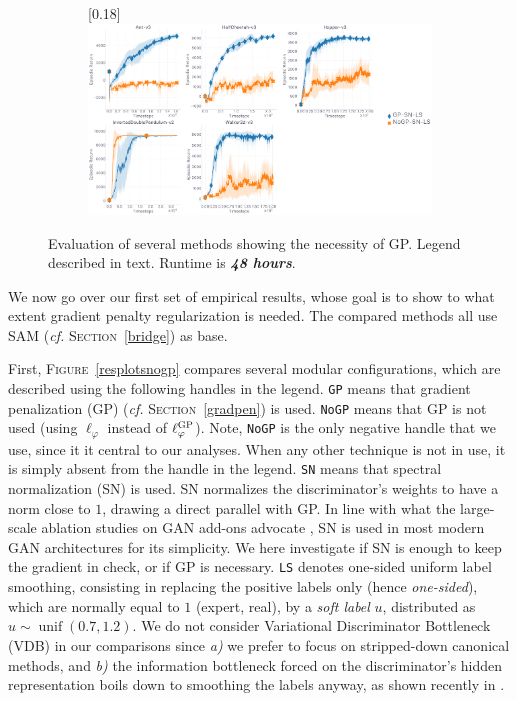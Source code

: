 \begin{figure}
  \center
  \begin{subfigure}[t]{0.99\textwidth}
    \center\scalebox{0.18}[0.18]{\includegraphics{Plots/fig03_gp_48h_5envs/plots_eval_env_ret_plot.pdf}}
  \end{subfigure}
  \caption{
  Evaluation of several methods showing the necessity of GP.
  Legend described in text.
  Runtime is \textbf{\emph{48 hours}}.}
  \label{resplotsgp2}
\end{figure}

We now go over our first set of empirical results, whose goal is to show
to what extent gradient penalty regularization is needed.
The compared methods all use SAM (\textit{cf.} \textsc{Section}~\ref{bridge})
as base.

First, \textsc{Figure}~\ref{resplotsnogp} compares several modular configurations,
which are described using the following handles in the legend.
\texttt{GP} means that gradient penalization (GP)
(\textit{cf.} \textsc{Section}~\ref{gradpen}) is used.
\texttt{NoGP} means that GP is not used
(using $\ell_\varphi$ instead of $\ell_\varphi^\textsc{GP}$).
Note, \texttt{NoGP} is the only negative handle that we use, since it it central to our analyses.
When any other technique is not in use, it is simply absent from the handle in the legend.
\texttt{SN} means that spectral normalization (SN) \cite{Miyato2018-wc} is used.
SN normalizes the discriminator's weights to have a norm close to $1$,
drawing a direct parallel with GP.
In line with what the large-scale ablation studies on GAN add-ons advocate
\cite{Lucic2017-nz,Kurach2018-cs}, SN is used in most modern GAN architectures for its simplicity.
We here investigate if SN is enough to keep the gradient in check, or if GP is necessary.
\texttt{LS} denotes one-sided uniform label smoothing, consisting in replacing
the positive labels only (hence \textit{one-sided}), which are normally equal to $1$ (expert, real),
by a \textit{soft label} $u$, distributed as $u \sim \operatorname{unif}(0.7,1.2)$.
We do not consider Variational Discriminator Bottleneck (VDB) \cite{Peng2018-mo}
in our comparisons since
\textit{a)} we prefer to focus on stripped-down canonical methods,
and \textit{b)} the information bottleneck forced on the discriminator's hidden representation
boils down to smoothing the labels anyway, as shown recently in \cite{Muller2019-rr}.

